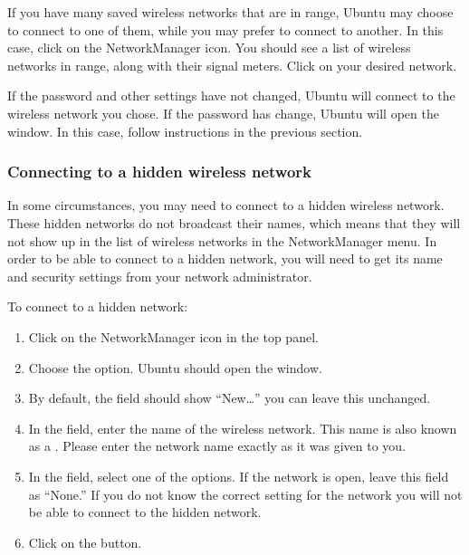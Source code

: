 If you have many saved wireless networks that are in range, Ubuntu may choose
to connect to one of them, while you may prefer to connect to another. 
In this case, click on the NetworkManager icon. You should see a list
of wireless networks in range, along with their signal meters. Click
on your desired network.

If the password and other settings have not changed, Ubuntu will connect
to the wireless network you chose. If the password has change, Ubuntu will
open the  window. In this case, follow instructions in the previous section.

\subsubsection{Connecting to a hidden wireless network}

In some circumstances, you may need to connect to a hidden wireless network.
These hidden networks do not broadcast their names, which means that they
will not show up in the list of wireless networks in the NetworkManager menu.
In order to be able to connect to a hidden network, you will need to get its
name and security settings from your network administrator.

To connect to a hidden network:

\begin{enumerate}
  \item Click on the NetworkManager icon in the top panel.
  \item Choose the  option. 
    Ubuntu should open the  window.
  \item By default, the  field should show ``New\ldots'' 
    \dash you can leave this unchanged.
  \item In the  field, enter the name of the wireless 
    network. This name is also known as a \emph{}. Please enter the
    network name exactly as it was given to you.
  \item In the  field, select one of the options. 
    If the network is open, leave this field as ``None.'' If you do not know
    the correct setting for the network you will not be able to connect
    to the hidden network.
  \item Click on the  button.
\end{enumerate}

